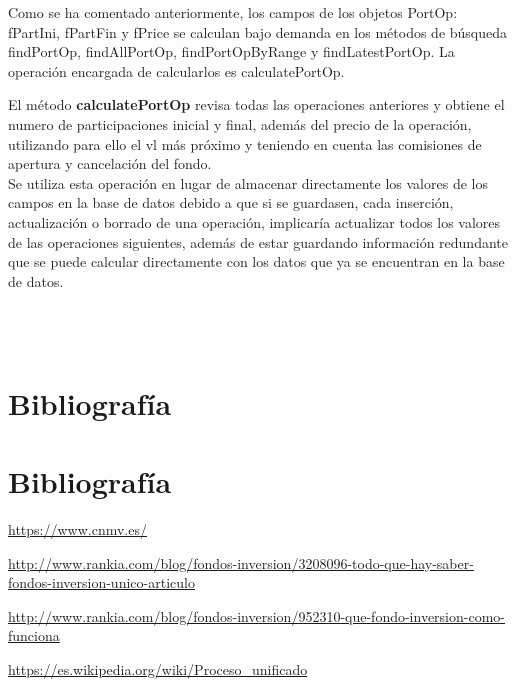 \documentclass[12pt, a4paper]{article}
\newcommand*\parttitle{}
\let\origpart\part
\renewcommand*{\part}[2][]{%
	\ifx\\#1\\%
	\origpart{#2}%
	\renewcommand*\parttitle{#2}%
	\else
	\origpart[#1]{#2}%
	\renewcommand*\parttitle{#1}%
	\fi
}
\begin{document}
Como se ha comentado anteriormente, los campos de los objetos PortOp:  fPartIni, fPartFin y fPrice se calculan bajo demanda en los métodos de búsqueda findPortOp, findAllPortOp, findPortOpByRange y findLatestPortOp. La operación encargada de calcularlos es calculatePortOp.\\

\newpage

El método \textbf{calculatePortOp} revisa todas las operaciones anteriores y obtiene el numero de participaciones inicial y final, además del precio de la operación, utilizando para ello el vl más próximo y teniendo en cuenta las comisiones de apertura y cancelación del fondo.\\

Se utiliza esta operación en lugar de almacenar directamente los valores de los campos en la base de datos debido a que si se guardasen, cada inserción, actualización o borrado de una operación, implicaría actualizar todos los valores de las operaciones siguientes, además de estar guardando información redundante que se puede calcular directamente con los datos que ya se encuentran en la base de datos.



\newpage
\part{Bibliografía}

\begin{thebibliography}{10}
	
	\bibitem[CNMV]{}
	\newline
	\href{https://www.cnmv.es/}{https://www.cnmv.es/}
	
	\bibitem[Rankia]{}
	\newline
	\href{http://www.rankia.com/blog/fondos-inversion/3208096-todo-que-hay-saber-fondos-inversion-unico-articulo}{http://www.rankia.com/blog/fondos-inversion/3208096-todo-que-hay-saber-fondos-inversion-unico-articulo}
	
	\bibitem[Rankia]{}
	\newline
	\href{http://www.rankia.com/blog/fondos-inversion/952310-que-fondo-inversion-como-funciona}{http://www.rankia.com/blog/fondos-inversion/952310-que-fondo-inversion-como-funciona}
	
	\bibitem[Wikipedia]{}
	\newline
	\href{https://es.wikipedia.org/wiki/Proceso\_unificado}{https://es.wikipedia.org/wiki/Proceso\_unificado}
	
\end{thebibliography}
\newpage
{}
\printglossary[type=\acronymtype]
\end{document}
